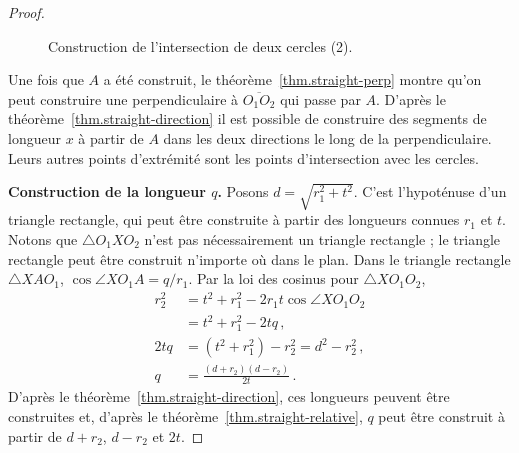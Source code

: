 \begin{proof}
\begin{figure}[htbp]
\centering

\caption{Construction de l'intersection de deux cercles (2).}\label{f.se-circle-circle2}
\end{figure}

Une fois que $A$ a été construit, le théorème~\ref{thm.straight-perp} montre qu'on peut construire une perpendiculaire à $\overline{O_1O_2}$ qui passe par $A$. D'après le théorème~\ref{thm.straight-direction} il est possible de construire des segments de longueur $x$ à partir de $A$ dans les deux directions le long de la perpendiculaire. Leurs autres points d'extrémité sont les points d'intersection avec les cercles.

\noindent\textbf{Construction de la longueur $q$.} Posons $d=\sqrt{r_1^2+t^2}$. C'est  l'hypoténuse d'un triangle rectangle, qui peut être construite à partir des longueurs connues $r_1$ et $t$. Notons que $\triangle O_1XO_2$ n'est pas nécessairement un triangle rectangle ; le triangle rectangle peut être construit n'importe où dans le plan. Dans le triangle rectangle $\triangle XAO_1$, $\cos\angle XO_1A=q/r_1$. Par la loi des cosinus  pour $\triangle XO_1O_2$,
\begin{align*}
r_2^2 &= t^2 + r_1^2 - 2r_1t\cos\angle XO_1O_2\\
&= t^2 + r_1^2 - 2tq\,,\\
2tq &= (t^2+r_1^2) - r_2^2=d^2-r_2^2\,,\\
q&=\frac{(d+r_2)(d-r_2)}{2t}\,.
\end{align*}
D'après le théorème~\ref{thm.straight-direction}, ces longueurs peuvent être construites et, d'après le théorème~\ref{thm.straight-relative}, $q$ peut être construit à partir de $d+r_2$, $d-r_2$ et $2t$.


\end{proof}
